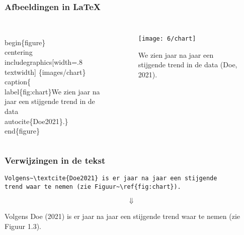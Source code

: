 \documentclass[aspectratio=169]{beamer}
\begin{document}
\begin{frame}
  \frametitle{Afbeeldingen in {\LaTeX}}

  \begin{columns}[c]

\begin{semiverbatim}
\small
\alert<1>{\\begin\{figure\}}
  \alert<2>{\\centering}
  \alert<3>{\\includegraphics[width=.8\\textwidth]
    \{images/chart\}}
  \alert<4>{\\caption\{\alert<5>{\\label\{fig:chart\}}We zien jaar
  na jaar een stijgende trend in
  de data \alert<6>{\\autocite\{Doe2021\}}.\}}
\alert<1>{\\end\{figure\}}
\end{semiverbatim}

    \begin{figure}
      \centering
      \texttt{[image: 6/chart]}
      \caption{\label{fig:chart}We zien jaar na jaar een stijgende trend in de data (Doe, 2021).}
    \end{figure}

  \end{columns}

\end{frame}

\begin{frame}[fragile]
  \frametitle{Verwijzingen in de tekst}

  \begin{verbatim}
Volgens~\textcite{Doe2021} is er jaar na jaar een stijgende
trend waar te nemen (zie Figuur~\ref{fig:chart}).
\end{verbatim}

  \[\Downarrow{}\]

  \bigskip

  Volgens Doe (2021) is er jaar na jaar een stijgende trend waar te nemen (zie Figuur 1.3).

\end{frame}
\end{document}

